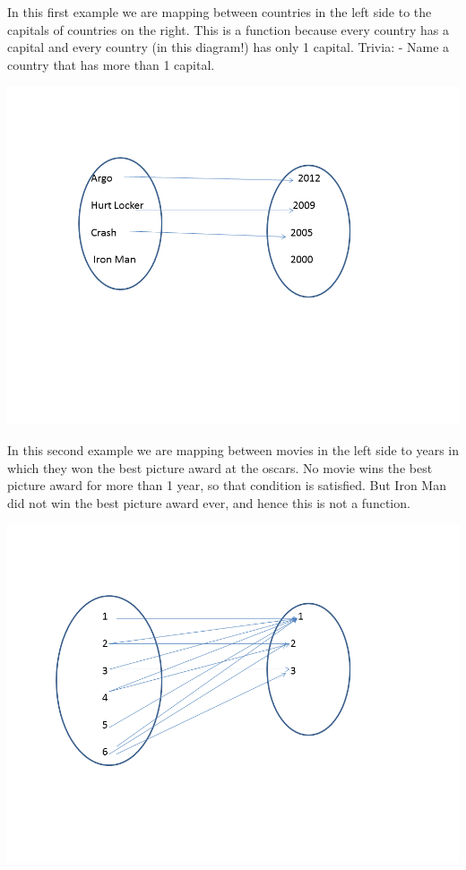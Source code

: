 \documentclass[12pt]{article}
\begin{document}
In this first example we are mapping between countries in the left side to the capitals of countries on the right. This is a function because every country has a capital and every country (in this diagram!) has only 1 capital. Trivia: - Name a country that has more than 1 capital.

\includegraphics[scale=0.5]{func2.png}

In this second example we are mapping between movies in the left side to years in which they won the best picture award at the oscars. No movie wins the best picture award for more than 1 year, so that condition is satisfied. But Iron Man did not win the best picture award ever, and hence this is not a function.

\includegraphics[scale=0.5]{func3.png}
\end{document}
